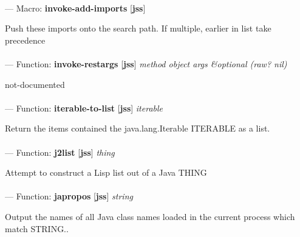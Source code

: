 \paragraph{}
\label{JSS:INVOKE-ADD-IMPORTS}
--- Macro: \textbf{invoke-add-imports} [\textbf{jss}] \textit{}

\begin{adjustwidth}{5em}{5em}
Push these imports onto the search path. If multiple, earlier in list take precedence
\end{adjustwidth}

\paragraph{}
\label{JSS:INVOKE-RESTARGS}
--- Function: \textbf{invoke-restargs} [\textbf{jss}] \textit{method object args \&optional (raw? nil)}

\begin{adjustwidth}{5em}{5em}
not-documented
\end{adjustwidth}

\paragraph{}
\label{JSS:ITERABLE-TO-LIST}
--- Function: \textbf{iterable-to-list} [\textbf{jss}] \textit{iterable}

\begin{adjustwidth}{5em}{5em}
Return the items contained the java.lang.Iterable ITERABLE as a list.
\end{adjustwidth}

\paragraph{}
\label{JSS:J2LIST}
--- Function: \textbf{j2list} [\textbf{jss}] \textit{thing}

\begin{adjustwidth}{5em}{5em}
Attempt to construct a Lisp list out of a Java THING
\end{adjustwidth}

\paragraph{}
\label{JSS:JAPROPOS}
--- Function: \textbf{japropos} [\textbf{jss}] \textit{string}

\begin{adjustwidth}{5em}{5em}
Output the names of all Java class names loaded in the current process which match STRING..
\end{adjustwidth}

